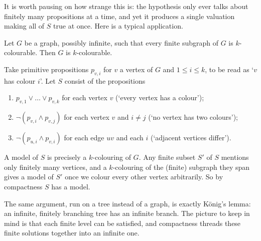 It is worth pausing on how strange this is: the hypothesis only ever talks about finitely many propositions at a time, and yet it produces a single valuation making all of $S$ true at once. Here is a typical application.

\begin{example}
  Let $G$ be a graph, possibly infinite, such that every finite subgraph of $G$ is $k$-colourable. Then $G$ is $k$-colourable.

  Take primitive propositions $p_{v, i}$ for $v$ a vertex of $G$ and $1 \leq i \leq k$, to be read as `$v$ has colour $i$'. Let $S$ consist of the propositions
  \begin{enumerate}[label=(\roman*)]
    \item $p_{v, 1} \lor \dots \lor p_{v, k}$ for each vertex $v$ (`every vertex has a colour');
    \item $\lnot(p_{v, i} \land p_{v, j})$ for each vertex $v$ and $i \neq j$ (`no vertex has two colours');
    \item $\lnot (p_{u, i} \land p_{v, i})$ for each edge $uv$ and each $i$ (`adjacent vertices differ').
  \end{enumerate}
  A model of $S$ is precisely a $k$-colouring of $G$. Any finite subset $S'$ of $S$ mentions only finitely many vertices, and a $k$-colouring of the (finite) subgraph they span gives a model of $S'$ once we colour every other vertex arbitrarily. So by compactness $S$ has a model.
\end{example}

The same argument, run on a tree instead of a graph, is exactly K\"onig's lemma: an infinite, finitely branching tree has an infinite branch. The picture to keep in mind is that each finite level can be satisfied, and compactness threads these finite solutions together into an infinite one.

\begin{center}
\end{center}


